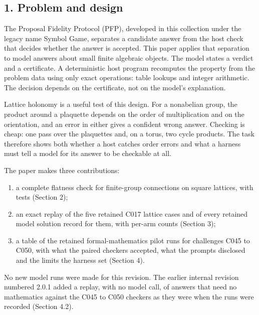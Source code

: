 \documentclass[
  11pt,
]{article}
\providecommand{\tightlist}{%
  \setlength{\itemsep}{0pt}\setlength{\parskip}{0pt}}
\begin{document}
\hypertarget{problem-and-design}{%
\subsection{1. Problem and design}\label{problem-and-design}}

The Proposal Fidelity Protocol (PFP), developed in this collection under
the legacy name Symbol Game, separates a candidate answer from the host
check that decides whether the answer is accepted. This paper applies
that separation to model answers about small finite algebraic objects.
The model states a verdict and a certificate. A deterministic host
program recomputes the property from the problem data using only exact
operations: table lookups and integer arithmetic. The decision depends
on the certificate, not on the model's explanation.

Lattice holonomy is a useful test of this design. For a nonabelian
group, the product around a plaquette depends on the order of
multiplication and on the orientation, and an error in either gives a
confident wrong answer. Checking is cheap: one pass over the plaquettes
and, on a torus, two cycle products. The task therefore shows both
whether a host catches order errors and what a harness must tell a model
for its answer to be checkable at all.

The paper makes three contributions:

\begin{enumerate}
\def\labelenumi{\arabic{enumi}.}
\tightlist
\item
  a complete flatness check for finite-group connections on square
  lattices, with tests (Section 2);
\item
  an exact replay of the five retained C017 lattice cases and of every
  retained model solution record for them, with per-arm counts (Section
  3);
\item
  a table of the retained formal-mathematics pilot runs for challenges
  C045 to C050, with what the paired checkers accepted, what the prompts
  disclosed and the limits the harness set (Section 4).
\end{enumerate}

No new model runs were made for this revision. The earlier internal
revision numbered 2.0.1 added a replay, with no model call, of answers
that need no mathematics against the C045 to C050 checkers as they were
when the runs were recorded (Section 4.2).
\end{document}
